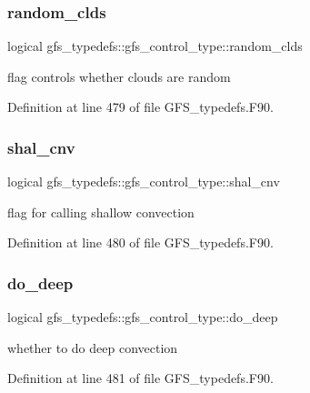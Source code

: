 \subsubsection{random\+\_\+clds}
{\footnotesize\ttfamily logical gfs\+\_\+typedefs\+::gfs\+\_\+control\+\_\+type\+::random\+\_\+clds}



flag controls whether clouds are random 



Definition at line 479 of file G\+F\+S\+\_\+typedefs.\+F90.

\mbox{\label{structgfs__typedefs_1_1gfs__control__type_a564d41cf954d484184c5da7bc3706a60}} 
\subsubsection{shal\+\_\+cnv}
{\footnotesize\ttfamily logical gfs\+\_\+typedefs\+::gfs\+\_\+control\+\_\+type\+::shal\+\_\+cnv}



flag for calling shallow convection 



Definition at line 480 of file G\+F\+S\+\_\+typedefs.\+F90.

\mbox{\label{structgfs__typedefs_1_1gfs__control__type_a6e7926161424ad3288740c7d8b60e7f7}} 
\subsubsection{do\+\_\+deep}
{\footnotesize\ttfamily logical gfs\+\_\+typedefs\+::gfs\+\_\+control\+\_\+type\+::do\+\_\+deep}



whether to do deep convection 



Definition at line 481 of file G\+F\+S\+\_\+typedefs.\+F90.

\mbox{\label{structgfs__typedefs_1_1gfs__control__type_a006253679096c777af53ef050902d71a}} 
